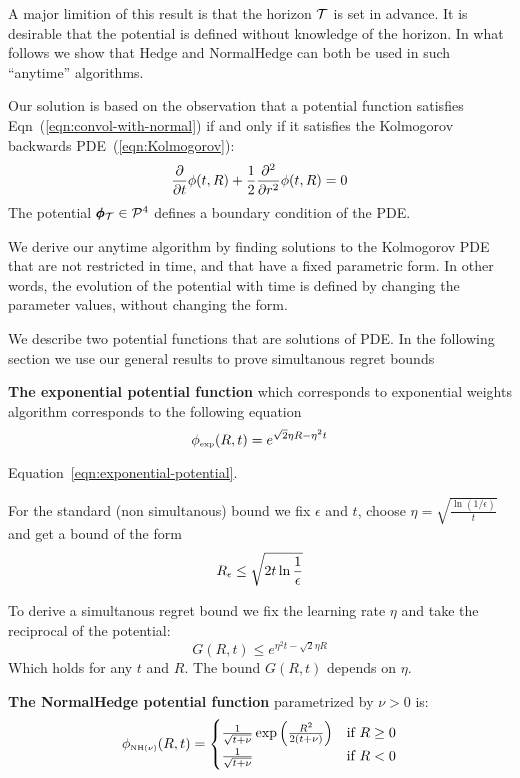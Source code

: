 \documentclass{article}[12pt]
\begin{document}
A major limition of this result is that the horizon $\mathcal{T}$ is set in
advance.  It is desirable that the potential is defined without
knowledge of the horizon.  In what follows we show that Hedge and
NormalHedge can both be used in such ``anytime'' algorithms.

Our solution is based on the observation that a potential function satisfies Eqn~(\ref{eqn:convol-with-normal}) if and only if it satisfies 
the Kolmogorov backwards PDE~(\ref{eqn:Kolmogorov}):
\begin{equation} 
  \frac{\partial}{\partial t} \phi(t,R)
  + \frac{1}{2} \frac{\partial^2}{\partial r^2} \phi(t,R)=0
\end{equation}
The potential $\pmb{\phi}_{\mathcal{T}} \in {\cal P}^{4}$ defines a boundary condition of the PDE.

We derive our anytime algorithm by finding solutions to the Kolmogorov
PDE that are not restricted in time, and that have a fixed parametric
form.  In other words, the evolution of the potential with time is
defined by changing the parameter values, without changing the form.

We describe two potential functions that are solutions of PDE. In the following section we use our general results to prove simultanous regret bounds

{\bf The exponential potential function} which corresponds to exponential
  weights algorithm corresponds to the following equation
\begin{equation} \label{eqn:exponential-potential}
    \phi_{\mbox{\tiny exp}}(R,t) = e^{\sqrt{2} \eta R - \eta^2 t}
\end{equation}

Equation~\ref{eqn:exponential-potential}.

For the standard (non simultanous) bound we fix $\epsilon$ and $t$,
choose $\eta = \sqrt{\frac{\ln (1/\epsilon)}{t}}$
and get a bound of the form 
  \begin{equation}
    R_\epsilon \leq \sqrt{2 t \ln \frac{1}{\epsilon}}
  \end{equation}

  To derive a simultanous regret bound we fix the learning rate $\eta$ and take the reciprocal of the potential:
 \[
    G(R,t) \leq e^{\eta^2 t - \sqrt{2}\eta R}
 \]
Which holds for any $t$ and $R$. The bound $G(R,t)$ depends on $\eta$.

  
{\bf The NormalHedge potential function} parametrized by $\nu>0$ is:
\begin{equation} \label{eqn:NormalHedge}
  \phi_{\mbox{\tiny NH$(\nu)$}}(R,t) = \begin{cases}
    \frac{1}{\sqrt{t+\nu}}\exp\left(\frac{R^2}{2(t+\nu)}\right)
    & \mbox{if } R \geq 0  \\
  \frac{1}{\sqrt{t+\nu}} & \mbox{if } R <0
  \end{cases}
\end{equation}
\end{document}
